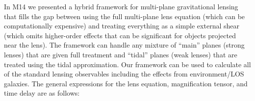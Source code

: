 In M14 we presented a hybrid framework for multi-plane gravitational lensing that fills the gap between using the full multi-plane lens equation (which can be computationally expensive) and treating everything as a simple external shear (which omits higher-order effects that can be significant for objects projected near the lens). The framework can handle any mixture of ``main'' planes (strong lenses) that are given full treatment and ``tidal'' planes (weak lenses) that are treated using the tidal approximation. Our framework can be used to calculate all of the standard lensing observables including the effects from environment/LOS galaxies. The general expressions for the lens equation, magnification tensor, and time delay are as follows:
\setlength{\arraycolsep}{2pt}